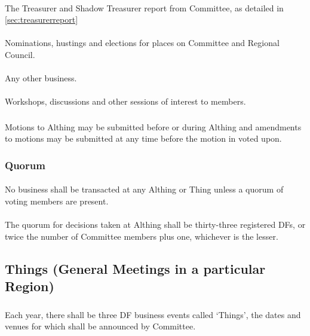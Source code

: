 \documentclass[a4paper, 12pt]{report}
\begin{document}
\paragraph{}
The Treasurer and Shadow Treasurer report from Committee, as detailed in \ref{sec:treasurerreport}
\paragraph{}
Nominations, hustings and elections for places on Committee and Regional Council.
\paragraph{}
Any other business.
\paragraph{}
Workshops, discussions and other sessions of interest to members.
\subsubsection{}
Motions to Althing may be submitted before or during Althing and amendments to motions may be submitted at any time before the motion in voted upon.
\subsubsection{Quorum}
\paragraph{} No business shall be transacted at any Althing or Thing unless a quorum of voting
members are present.
\paragraph{} The quorum for decisions taken at Althing shall be thirty-three registered DFs, or twice the number of Committee members plus one, whichever is the lesser.

\subsection{Things (General Meetings in a particular Region)}
\subsubsection{}
Each year, there shall be three DF business events called `Things', the dates and venues for which shall be announced by Committee.
\end{document}

